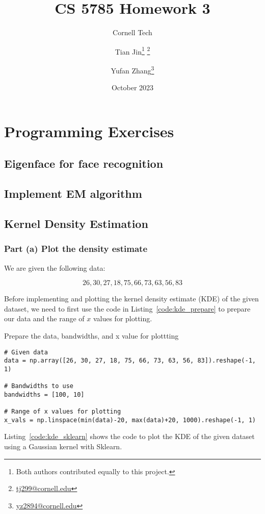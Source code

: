 \documentclass{article}
\title{CS 5785 Homework 3}
\subtitle{Cornell Tech}
\author{
    Tian Jin\thanks{Both authors contributed equally to this project.} \thanks{\href{mailto:tj299@cornell.edu}{tj299@cornell.edu}}
    \and 
    Yufan Zhang\footnotemark[1] \thanks{\href{mailto:yz2894@cornell.edu}{yz2894@cornell.edu}}
}
\date{October 2023}
\begin{document}
\maketitle

\section{Programming Exercises}
\subsection{Eigenface for face recognition}

\subsection{Implement EM algorithm}

\subsection{Kernel Density Estimation}

\subsubsection*{Part (a) Plot the density estimate}

We are given the following data: 

\[26, 30, 27, 18, 75, 66, 73, 63, 56, 83\]

Before implementing and plotting the kernel density estimate (KDE) of the given dataset, we need to first use the code in Listing~\ref{code:kde_prepare} to prepare our data and the range of $x$ values for plotting.

\begin{listing}[H]
\caption{Prepare the data, bandwidths, and x value for plottting}
\label{code:kde_prepare}
\begin{verbatim}
# Given data
data = np.array([26, 30, 27, 18, 75, 66, 73, 63, 56, 83]).reshape(-1, 1)

# Bandwidths to use
bandwidths = [100, 10]

# Range of x values for plotting
x_vals = np.linspace(min(data)-20, max(data)+20, 1000).reshape(-1, 1)
\end{verbatim}
\end{listing}

Listing~\ref{code:kde_sklearn} shows the code to plot the KDE of the given dataset using a Gaussian kernel with Sklearn.
\end{document}
